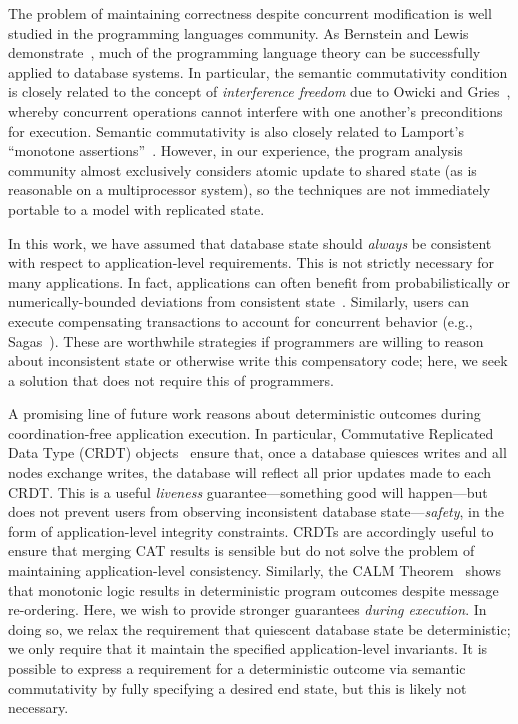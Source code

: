  The problem of maintaining correctness
despite concurrent modification is well studied in the programming
languages community. As Bernstein and Lewis
demonstrate~\cite{decomp-semantics}, much of the programming language
theory can be successfully applied to database systems. In particular,
the semantic commutativity condition is closely related to the concept
of \textit{interference freedom} due to Owicki and Gries~\cite{owickigries}, whereby
concurrent operations cannot interfere with one another's
preconditions for execution. Semantic commutativity is also closely
related to Lamport's ``monotone
assertions''~\cite{lamport-correctness}. However, in our experience,
the program analysis community almost exclusively considers atomic
update to shared state (as is reasonable on a multiprocessor system),
so the techniques are not immediately portable to a model with
replicated state.

 In this work, we have assumed that
database state should \textit{always} be consistent with respect to
application-level requirements. This is not strictly necessary for
many applications. In fact, applications can often benefit from
probabilistically or numerically-bounded deviations from consistent
state~\cite{epsilon-divergence}. Similarly, users can execute
compensating transactions to account for concurrent behavior (e.g.,
Sagas~\cite{sagas}). These are worthwhile strategies if programmers
are willing to reason about inconsistent state or otherwise write this
compensatory code; here, we seek a solution that does not require this
of programmers.

 A promising line of future work
reasons about deterministic outcomes during coordination-free
application execution. In particular, Commutative Replicated Data Type
(CRDT) objects~\cite{crdt} ensure that, once a database quiesces
writes and all nodes exchange writes, the database will reflect all
prior updates made to each CRDT. This is a useful \textit{liveness}
guarantee---something good will happen---but does not prevent users
from observing inconsistent database state---\textit{safety}, in the
form of application-level integrity constraints. CRDTs are accordingly
useful to ensure that merging CAT results is sensible but do not solve
the problem of maintaining application-level consistency. Similarly,
the CALM Theorem~\cite{calm} shows that monotonic logic results in deterministic
program outcomes despite message re-ordering. Here, we wish to provide
stronger guarantees \textit{during execution}. In doing so, we relax
the requirement that quiescent database state be deterministic; we
only require that it maintain the specified application-level
invariants. It is possible to express a requirement for a
deterministic outcome via semantic commutativity by fully specifying a
desired end state, but this is likely not necessary.


